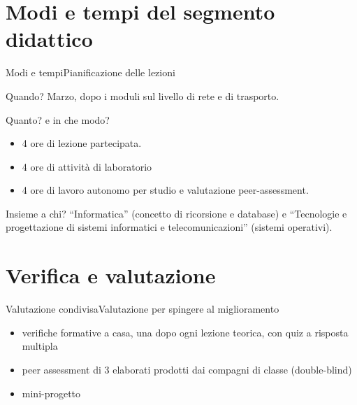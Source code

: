 \documentclass[italian]{beamer}
\begin{document}
\section[Modi e tempi]{Modi e tempi del segmento didattico}
\begin{frame}{Modi e tempi}{Pianificazione delle lezioni}
	
	\begin{block}{Quando?}
	Marzo, dopo i moduli sul livello di rete e di trasporto.
	\end{block}
	
	\begin{block}{Quanto? e in che modo?}
	\begin{itemize}
		\item 4 ore di lezione partecipata.
		\item 4 ore di attivit\`a di laboratorio
		\item 4 ore di lavoro autonomo per studio e valutazione peer-assessment.
	\end{itemize}
	\end{block}

	\begin{block}{Insieme a chi?}
		``Informatica'' (concetto di ricorsione e database) e ``Tecnologie e progettazione di sistemi informatici e telecomunicazioni'' (sistemi operativi).
	\end{block}
\end{frame}


\section[Verifica e valutazione]{Verifica e valutazione}
\begin{frame}{Valutazione condivisa}{Valutazione per spingere al miglioramento}
	
	\begin{itemize}
		\item verifiche formative a casa, una dopo ogni lezione teorica, con quiz a risposta multipla
		\item peer assessment di 3 elaborati prodotti dai compagni di classe (double-blind)
		\item mini-progetto
	\end{itemize}
	
	\note{%
		
	}%
\end{frame}
\end{document}
